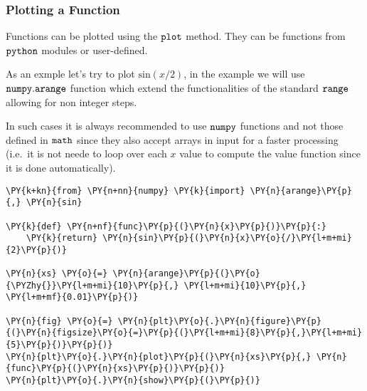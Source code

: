     \hypertarget{plotting-a-function}{%
\subsubsection{Plotting a Function}\label{plotting-a-function}}

Functions can be plotted using the \(\tt{plot}\) method. They can be
functions from \(\tt{python}\) modules or user-defined.

As an exmple let's try to plot \(\mathrm{sin}(x/2)\), in the example we
will use \(\tt{numpy.arange}\) function which extend the functionalities
of the standard \(\tt{range}\) allowing for non integer steps.

In such cases it is always recommended to use \(\tt{numpy}\) functions
and not those defined in \(\tt{math}\) since they also accept arrays in
input for a faster processing (i.e.~it is not neede to loop over each
\(x\) value to compute the value function since it is done
automatically).

    \begin{tcolorbox}[breakable, size=fbox, boxrule=1pt, pad at break*=1mm,colback=cellbackground, colframe=cellborder]
\begin{Verbatim}[commandchars=\\\{\}]
\PY{k+kn}{from} \PY{n+nn}{numpy} \PY{k}{import} \PY{n}{arange}\PY{p}{,} \PY{n}{sin}

\PY{k}{def} \PY{n+nf}{func}\PY{p}{(}\PY{n}{x}\PY{p}{)}\PY{p}{:}
    \PY{k}{return} \PY{n}{sin}\PY{p}{(}\PY{n}{x}\PY{o}{/}\PY{l+m+mi}{2}\PY{p}{)}

\PY{n}{xs} \PY{o}{=} \PY{n}{arange}\PY{p}{(}\PY{o}{\PYZhy{}}\PY{l+m+mi}{10}\PY{p}{,} \PY{l+m+mi}{10}\PY{p}{,} \PY{l+m+mf}{0.01}\PY{p}{)}

\PY{n}{fig} \PY{o}{=} \PY{n}{plt}\PY{o}{.}\PY{n}{figure}\PY{p}{(}\PY{n}{figsize}\PY{o}{=}\PY{p}{(}\PY{l+m+mi}{8}\PY{p}{,}\PY{l+m+mi}{5}\PY{p}{)}\PY{p}{)}
\PY{n}{plt}\PY{o}{.}\PY{n}{plot}\PY{p}{(}\PY{n}{xs}\PY{p}{,} \PY{n}{func}\PY{p}{(}\PY{n}{xs}\PY{p}{)}\PY{p}{)}
\PY{n}{plt}\PY{o}{.}\PY{n}{show}\PY{p}{(}\PY{p}{)}
\end{Verbatim}
\end{tcolorbox}

    \begin{center}
    \end{center}
    { \hspace*{\fill} \\}
    
